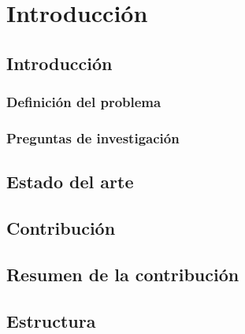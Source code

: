 % 
% 
% 
% 
% 
% 
% 
% 

\chapter{Introducción}
\label{cha:introduccion}


\section{Introducción}
\label{sec:introduccion}

\subsection{Definición del problema}
\label{sec:definicion-problema}

\subsection{Preguntas de investigación}
\label{sec:preguntas-investigacion}


\section{Estado del arte}
\label{sec:estado-arte}

\section{Contribución}
\label{sec:contribucion}

\section{Resumen de la contribución}
\label{sec:resumen-contribucion}

\section{Estructura}
\label{sec:estructura}









